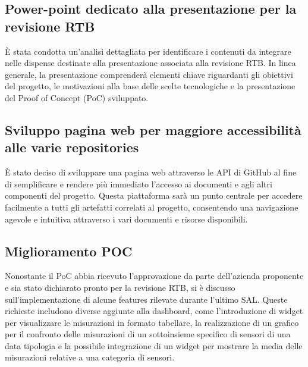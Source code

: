 \documentclass{article}
\begin{document}
    \subsection{Power-point dedicato alla presentazione per la revisione RTB}
    È stata condotta un'analisi dettagliata per identificare i contenuti da integrare nelle dispense destinate alla presentazione associata alla revisione RTB. In linea generale, la presentazione comprenderà elementi chiave riguardanti gli obiettivi del progetto, le motivazioni alla base delle scelte tecnologiche e la presentazione del Proof of Concept (PoC) sviluppato.

    \subsection{Sviluppo pagina web per maggiore accessibilità alle varie repositories}
    È stato deciso di sviluppare una pagina web attraverso le API di GitHub al fine di semplificare e rendere più immediato l'accesso ai documenti e agli altri componenti del progetto. Questa piattaforma sarà un punto centrale per accedere facilmente a tutti gli artefatti correlati al progetto, consentendo una navigazione agevole e intuitiva attraverso i vari documenti e risorse disponibili.

    \subsection{Miglioramento POC}
    Nonostante il PoC abbia ricevuto l'approvazione da parte dell’azienda proponente e sia stato dichiarato pronto per la revisione RTB, si è discusso sull'implementazione di alcune features rilevate durante l'ultimo SAL. Queste richieste includono diverse aggiunte alla dashboard, come l'introduzione di widget per visualizzare le misurazioni in formato tabellare, la realizzazione di un grafico per il confronto delle misurazioni di un sottoinsieme specifico di sensori di una data tipologia e la possibile integrazione di un widget per mostrare la media delle misurazioni relative a una categoria di sensori.
\end{document}
